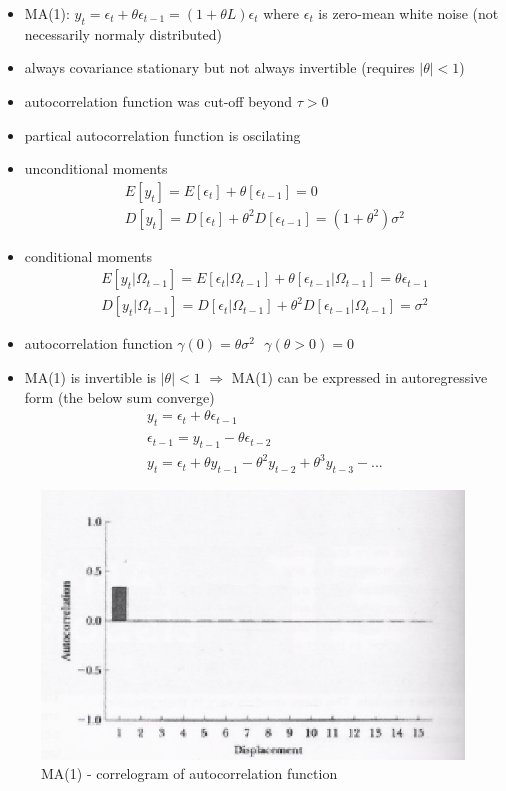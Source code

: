\begin{itemize}
\item MA(1): $y_t = \epsilon_t + \theta \epsilon_{t-1} = (1 + \theta L)\epsilon_t$ where $\epsilon_t$ is zero-mean white noise (not necessarily normaly distributed)
\item always covariance stationary but not always invertible (requires $|\theta| < 1$)
\item autocorrelation function was cut-off beyond $\tau > 0$
\item partical autocorrelation function is oscilating
\item unconditional moments
\begin{gather*}
E[y_t] = E[\epsilon_t] + \theta[\epsilon_{t - 1}] = 0\\
D[y_t] = D[\epsilon_t] + \theta^2 D[\epsilon_{t - 1}] = (1 + \theta^2)\sigma^2
\end{gather*}
\item conditional moments
\begin{gather*}
E[y_t | \Omega_{t-1}] = E[\epsilon_t | \Omega_{t-1}] + \theta[\epsilon_{t - 1} | \Omega_{t-1}] = \theta \epsilon_{t - 1}\\
D[y_t | \Omega_{t-1}] = D[\epsilon_t | \Omega_{t-1}] + \theta^2 D[\epsilon_{t - 1}| \Omega_{t-1}] = \sigma^2
\end{gather*}
\item autocorrelation function $\gamma(0) = \theta \sigma^2 ~~~ \gamma(\theta > 0) = 0$
\item MA(1) is invertible is $|\theta| < 1$ $\Rightarrow$ MA(1) can be expressed in autoregressive form (the below sum converge)
\begin{gather*}
y_t = \epsilon_t + \theta \epsilon_{t - 1}\\
\epsilon_{t - 1} = y_{t - 1} - \theta \epsilon_{t - 2}\\
y_t = \epsilon_t + \theta y_{t-1} - \theta^2 y_{t-2} + \theta^3 y_{t - 3} - ...
\end{gather*}
\end{itemize}

\begin{figure}[htp]
\centering
\includegraphics[scale = 0.75]{MA1.eps}
\caption{MA(1) - correlogram of autocorrelation function}
\label{MA1}
\end{figure}

